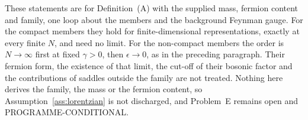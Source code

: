 These statements are for Definition~(A) with the supplied mass, fermion content and family, one loop about the members and the background Feynman gauge. For the compact members they hold for finite-dimensional representations, exactly at every finite \(N\), and need no limit. For the non-compact members the order is \(N\to\infty\) first at fixed \(\gamma>0\), then \(\epsilon\to0\), as in the preceding paragraph. Their fermion form, the existence of that limit, the cut-off of their bosonic factor and the contributions of saddles outside the family are not treated. Nothing here derives the family, the mass or the fermion content, so Assumption~\ref{ass:lorentzian} is not discharged, and Problem~E remains open and PROGRAMME-CONDITIONAL.
